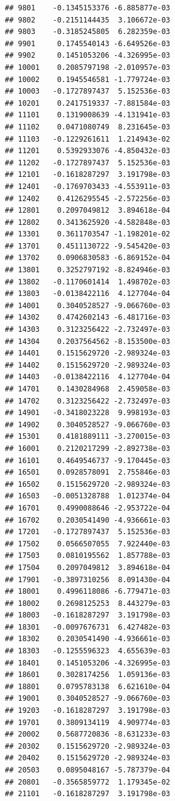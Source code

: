 \begin{frame}[fragile]
\begin{verbatim}
## 9801    -0.1345153376 -6.885877e-03
## 9802    -0.2151144435  3.106672e-03
## 9803    -0.3185245805  6.282359e-03
## 9901     0.1745540143 -6.649526e-03
## 9902     0.1451053206 -4.326995e-03
## 10001    0.2085797198 -2.010957e-03
## 10002    0.1945546581 -1.779724e-03
## 10003   -0.1727897437  5.152536e-03
## 10201    0.2417519337 -7.881584e-03
## 11101    0.1319008639 -4.131941e-03
## 11102    0.0471080749  8.231645e-03
## 11103   -0.1229261611  1.214943e-02
## 11201    0.5392933076 -4.850432e-03
## 11202   -0.1727897437  5.152536e-03
## 12101   -0.1618287297  3.191798e-03
## 12401   -0.1769703433 -4.553911e-03
## 12402    0.4126295545 -2.572256e-03
## 12801    0.2097049812  3.894618e-04
## 12802    0.3413625920 -4.582848e-03
## 13301    0.3611703547 -1.198201e-02
## 13701    0.4511130722 -9.545420e-03
## 13702    0.0906830583 -6.869152e-04
## 13801    0.3252797192 -8.824946e-03
## 13802   -0.1170601414  1.498702e-03
## 13803   -0.0138422116  4.127704e-04
## 14001    0.3040528527 -9.066760e-03
## 14302    0.4742602143 -6.481716e-03
## 14303    0.3123256422 -2.732497e-03
## 14304    0.2037564562 -8.153500e-03
## 14401    0.1515629720 -2.989324e-03
## 14402    0.1515629720 -2.989324e-03
## 14403   -0.0138422116  4.127704e-04
## 14701    0.1430284968  2.459058e-03
## 14702    0.3123256422 -2.732497e-03
## 14901   -0.3418023228  9.998193e-03
## 14902    0.3040528527 -9.066760e-03
## 15301    0.4181889111 -3.270015e-03
## 16001    0.2120217299 -2.892738e-03
## 16101    0.4649546737 -9.170445e-03
## 16501    0.0928578091  2.755846e-03
## 16502    0.1515629720 -2.989324e-03
## 16503   -0.0051328788  1.012374e-04
## 16701    0.4990088646 -2.953722e-04
## 16702    0.2030541490 -4.936661e-03
## 17201   -0.1727897437  5.152536e-03
## 17502    0.0566507055  7.922440e-03
## 17503    0.0810195562  1.857788e-03
## 17504    0.2097049812  3.894618e-04
## 17901   -0.3897310256  8.091430e-04
## 18001    0.4996118086 -6.779471e-03
## 18002    0.2698125253  8.443279e-03
## 18003   -0.1618287297  3.191798e-03
## 18301   -0.0097676731  6.427482e-03
## 18302    0.2030541490 -4.936661e-03
## 18303   -0.1255596323  4.655639e-03
## 18401    0.1451053206 -4.326995e-03
## 18601    0.3028174256  1.059136e-03
## 18801    0.0795783138  6.621610e-04
## 19001    0.3040528527 -9.066760e-03
## 19203   -0.1618287297  3.191798e-03
## 19701    0.3809134119  4.909774e-03
## 20002    0.5687720836 -8.631233e-03
## 20302    0.1515629720 -2.989324e-03
## 20402    0.1515629720 -2.989324e-03
## 20503    0.0895048167 -5.787379e-04
## 20801   -0.3565859772  1.179345e-02
## 21101   -0.1618287297  3.191798e-03

\end{verbatim}
\end{frame}
